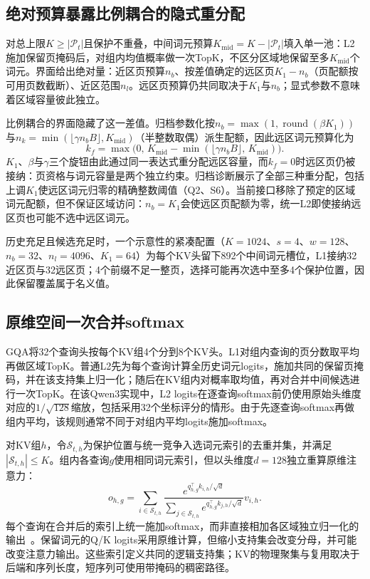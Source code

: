 \documentclass[conference,9pt,letterpaper]{IEEEtran}
\begin{document}
\subsection{绝对预算暴露比例耦合的隐式重分配}
对总上限$K\geq|\mathcal P_t|$且保护不重叠，中间词元预算$K_{\mathrm{mid}}=K-|\mathcal P_t|$填入单一池：L2施加保留页掩码后，对组内均值概率做一次TopK，不区分区域地保留至多$K_{\mathrm{mid}}$个词元。界面给出绝对量：近区页预算$n_b$、按差值确定的远区页$K_1-n_b$（页配额按可用页数截断）、近区范围$n_l$。远区页预算仍共同取决于$K_1$与$n_b$；显式参数不意味着区域容量彼此独立。

比例耦合的界面隐藏了这一差值。归档参数化按$n_b=\max(1,\operatorname{round}(\beta K_1))$与$n_k=\min(\lfloor\gamma n_bB\rfloor,K_{\mathrm{mid}})$（半整数取偶）派生配额，因此远区词元预算化为
\begin{equation}
k_f=\max\bigl(0,\,K_{\mathrm{mid}}-\min(\lfloor\gamma n_bB\rfloor,\,K_{\mathrm{mid}})\bigr).
\label{eq:coupling}
\end{equation}
$K_1$、$\beta$与$\gamma$三个旋钮由此通过同一表达式重分配远区容量，而$k_f=0$时远区页仍被接纳：页资格与词元容量是两个独立约束。归档诊断展示了全部三种重分配，包括上调$K_1$使远区词元归零的精确整数阈值（Q2、S6）。当前接口移除了预定的区域词元配额，但不保证区域访问：$n_b=K_1$会使远区页配额为零，统一L2即使接纳远区页也可能不选中远区词元。

历史充足且候选充足时，一个示意性的紧凑配置（$K=1024$、$s=4$、$w=128$、$n_b=32$、$n_l=4096$、$K_1=64$）为每个KV头留下892个中间词元槽位，L1接纳32近区页与32远区页；4个前缀不足一整页，选择可能再次选中至多4个保护位置，因此保留覆盖属于名义值。

\subsection{原维空间一次合并softmax}
GQA将32个查询头按每个KV组4个分到8个KV头。L1对组内查询的页分数取平均再做区域TopK。普通L2先为每个查询计算全历史词元logits，施加共同的保留页掩码，并在该支持集上归一化；随后在KV组内对概率取均值，再对合并中间候选进行一次TopK。在该Qwen3实现中，L2 logits在逐查询softmax前仍使用原始头维度对应的$1/\sqrt{128}$缩放，包括采用32个坐标评分的情形。由于先逐查询softmax再做组内平均，该规则通常不同于对组内平均logits施加softmax。

对KV组$h$，令$\mathcal S_{t,h}$为保护位置与统一竞争入选词元索引的去重并集，并满足$|\mathcal S_{t,h}|\leq K$。组内各查询$g$使用相同词元索引，但以头维度$d=128$独立重算原维注意力：
\begin{equation}
o_{h,g}=\sum_{i\in\mathcal S_{t,h}}\frac{e^{q_{h,g}^{\top}k_{i,h}/\sqrt d}}{\sum_{j\in\mathcal S_{t,h}}e^{q_{h,g}^{\top}k_{j,h}/\sqrt d}}v_{i,h}.
\end{equation}
每个查询在合并后的索引上统一施加softmax，而非直接相加各区域独立归一化的输出~\cite{salo}。保留词元的Q/K logits采用原维计算，但缩小支持集会改变分母，并可能改变注意力输出。这些索引定义共同的逻辑支持集；KV的物理聚集与复用取决于后端和序列长度，短序列可使用带掩码的稠密路径。
\end{document}
